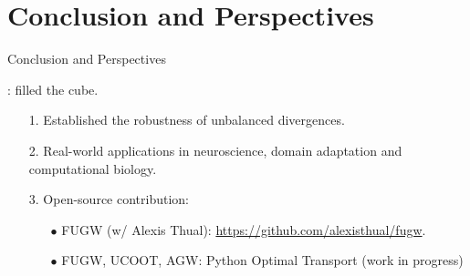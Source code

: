 \documentclass{beamer}
\begin{document}
\section{Conclusion and Perspectives}
\begin{frame}{Conclusion and Perspectives}
\scriptsize

{}: filled the cube.
\begin{enumerate}
  \item[1.] Established the robustness of unbalanced divergences.
  \item[2.] Real-world applications in neuroscience, domain adaptation and computational biology.
  \item[3.] Open-source contribution:
  \begin{itemize}
    \setlength\itemindent{5pt}
    \scriptsize
    \item[$\bullet$] FUGW (w/ Alexis Thual): \url{https://github.com/alexisthual/fugw}.
    \item[$\bullet$] FUGW, UCOOT, AGW: Python Optimal Transport (work in progress)
  \end{itemize}
\end{enumerate}


\end{frame}
\end{document}
